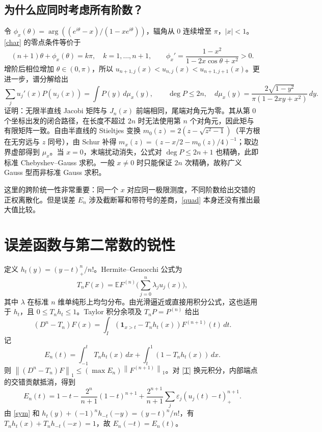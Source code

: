 \documentclass[11pt,a4paper,fontset=fandol]{ctexart}
\newcommand{\E}{\mathbb E}
\newcommand{\norm}[1]{\left\|#1\right\|_1}
\theoremstyle{remark}\newtheorem{conjecture}{猜想}
\begin{document}
\subsection{为什么应同时考虑所有阶数？}
令 $\phi_x(\theta)=\arg((e^{i\theta}-x)/(1-xe^{i\theta}))$，辐角从 $0$ 连续增至 $\pi$，$|x|<1$。\eqref{char} 的零点条件等价于
\[
 (n+1)\theta+\phi_x(\theta)=k\pi,\quad k=1,\dots,n+1,\qquad \phi_x'=\frac{1-x^2}{1-2x\cos\theta+x^2}>0.
\]
增阶后相位增加 $\theta\in(0,\pi)$，所以 $u_{n+1,j}(x)<u_{n,j}(x)<u_{n+1,j+1}(x)$。更进一步，谱分解给出
\begin{equation}\label{quad}
 \sum_j u_j'(x)P(u_j(x))=\int P(y)\,d\mu_x(y),\qquad \deg P\le 2n,
 \quad d\mu_x(y)=\frac{2\sqrt{1-y^2}}{\pi(1-2xy+x^2)}\,dy.
\end{equation}
证明：无限半直线 Jacobi 矩阵与 $J_n(x)$ 前端相同，尾端对角元为零。其从第 0 个坐标出发的闭合路径，在长度不超过 $2n$ 时无法使用第 $n$ 个对角元，因此矩与有限矩阵一致。自由半直线的 Stieltjes 变换 $m_0(z)=2(z-\sqrt{z^2-1})$（平方根在无穷远与 $z$ 同号），由 Schur 补得 $m_x(z)=(z-x/2-m_0(z)/4)^{-1}$；取边界虚部得到 $\mu_x$。当 $x=0$，末端扰动消失，公式对 $\deg P\le2n+1$ 也精确，此即标准 Chebyshev--Gauss 求积。一般 $x\ne0$ 时只能保证 $2n$ 次精确，故称广义 Gauss 型而非标准 Gauss 求积。

这里的跨阶统一性非常重要：同一个 $x$ 对应同一极限测度，不同阶数给出交错的正权离散化。但是误差 $E_n$ 涉及截断幂和带符号的差商，\eqref{quad} 本身还没有推出最大值比较。

\section{误差函数与第二常数的锐性}\label{sec:sharp}
定义 $h_t(y)=(y-t)_+^n/n!$。Hermite--Genocchi 公式为
\[
 T_nF(x)=\E F^{(n)}\Big(\sum_{j=0}^n\lambda_j u_j(x)\Big),
\]
其中 $\lambda$ 在标准 $n$ 维单纯形上均匀分布。由光滑逼近或直接用积分公式，这也适用于 $h_t$，且 $0\le T_nh_t\le1$。Taylor 积分余项及 $T_nP=P^{(n)}$ 给出
\[
 (D^n-T_n)F(x)=\int_I(\mathbf1_{x>t}-T_nh_t(x))F^{(n+1)}(t)\,dt.
\]
记
\begin{equation}\label{E}
 E_n(t)=\int_{-1}^tT_nh_t(x)\,dx+\int_t^1(1-T_nh_t(x))\,dx.
\end{equation}
则 $\norm{(D^n-T_n)F}\le (\max E_n)\norm{F^{(n+1)}}$。对 \eqref{T} 换元积分，内部端点的交错贡献抵消，得到
\begin{equation}\label{Eexplicit}
 \boxed{E_n(t)=1-t-\frac{2^n}{n+1}(1-t)^{n+1}
 +\frac{2^{n+1}}{n+1}\sum_j\varepsilon_j(u_j(t)-t)_+^{n+1}.}
\end{equation}
由 \eqref{sym} 和 $h_t(y)+(-1)^nh_{-t}(-y)=(y-t)^n/n!$，有 $T_nh_t(x)+T_nh_{-t}(-x)=1$，故 $E_n(-t)=E_n(t)$。
\end{document}
